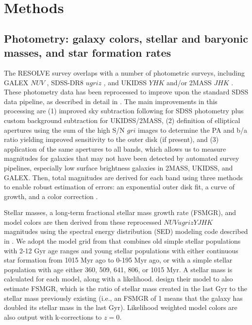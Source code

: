 \documentclass[iop,apj]{emulateapj}
\begin{document}
\section{Methods}
\label{methods}

\subsection{Photometry: galaxy colors, stellar and baryonic masses, and star formation rates}
\label{phot}
\noindent The RESOLVE survey overlaps with a number of photometric surveys, including GALEX $NUV$ \citep{Morrissey2007}, SDSS-DR8 $ugriz$ \citep{Aihara2011}, and UKIDSS $YHK$ and/or 2MASS $JHK$ \citep{Skrutskie2006}. These photometry data has been reprocessed to improve upon the standard SDSS data pipeline, as described in detail in \citet{Eckert2015}. The main improvements in this processing are (1) improved sky subtraction following \citet{Blanton2011} for SDSS photometry plus custom background subtraction for UKIDSS/2MASS, (2) definition of elliptical apertures using the sum of the high S/N $gri$ images to determine the PA and b/a ratio yielding improved sensitivity to the outer disk (if present), and (3) application of the same apertures to all bands, which allows us to measure magnitudes for galaxies that may not have been detected by automated survey pipelines, especially low surface brightness galaxies in 2MASS, UKIDSS, and GALEX. Then, total magnitudes are derived for each band using three methods to enable robust estimation of errors: an exponential outer disk fit, a curve of growth, and a color correction  \citep[Figure 2 in][]{Eckert2015}. 

Stellar masses, a long-term fractional stellar mass growth rate (FSMGR), and model colors are then derived from these reprocessed $NUVugrizYJHK$ magnitudes using the spectral energy distribution (SED) modeling code described in  \citet{Kannappan2013}. We adopt the model grid from \citet{Kannappan2013} that combines old simple stellar populations with 2-12 Gyr age ranges and young stellar populations with either continuous star formation from 1015 Myr ago to 0-195 Myr ago, or with a simple stellar population with age either 360, 509, 641, 806, or 1015 Myr. A stellar mass is calculated for each model, along with a likelihood. \citet{Kannappan2013} design their model to also estimate FSMGR, which is the ratio of stellar mass created in the last Gyr to the stellar mass previously existing (i.e., an FSMGR of 1 means that the galaxy has doubled its stellar mass in the last Gyr). Likelihood weighted model colors are also output with k-corrections to $z=0$. 
\end{document}
